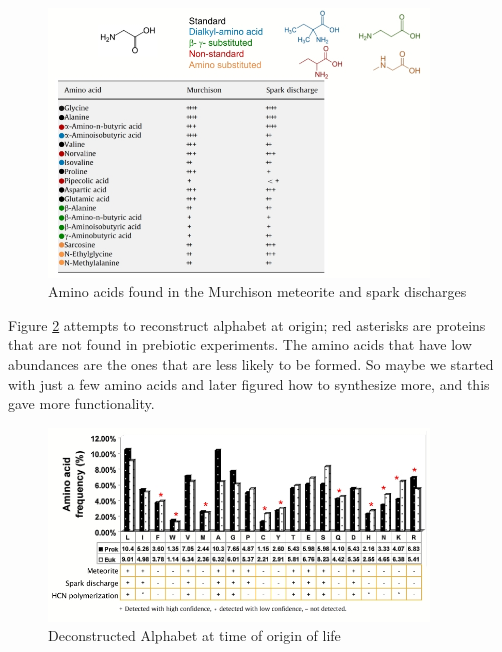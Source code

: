 \documentclass[]{article}
\begin{document}
\begin{figure}[H]
	\caption{Amino acids found in the Murchison meteorite and spark discharges} \label{fig:PrebioticAminoAcids} 
	\includegraphics[width=0.9\textwidth]{PrebioticAminoAcids}
\end{figure}

Figure \ref{fig:ReducedAlphabet} attempts to reconstruct alphabet at origin; red asterisks are proteins that are not found in prebiotic experiments. The amino acids that have low abundances are the ones that are less likely to be formed. So maybe we started with just a few amino acids and later figured how to synthesize more, and this gave more functionality. 
\begin{figure}[H]
	\caption{Deconstructed Alphabet at time of origin of life} \label{fig:ReducedAlphabet} 
	\includegraphics[width=0.9\textwidth]{ReducedAlphabet}
\end{figure}
\end{document}
